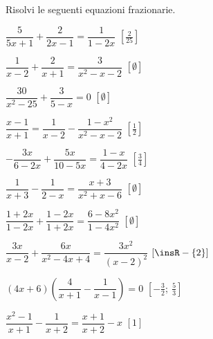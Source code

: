 \begin{esercizio}[\Ast]
\label{ese:20.21}
Risolvi le seguenti equazioni frazionarie.
\begin{multicols}{2}
\begin{enumeratea}
 \item \(\dfrac{5}{5x+1}+\dfrac{2}{2x-1}=\dfrac{1}{1-2x}\)
  \hfill \(\left[\frac{2}{25}\right]\)
 \item \(\dfrac{1}{x-2}+\dfrac{2}{x+1}=\dfrac{3}{x^{2}-x-2}\)
  \hfill \(\left[\emptyset\right]\)
 \item \(\dfrac{30}{x^{2}-25}+\dfrac{3}{5-x}=0\)
  \hfill \(\left[\emptyset\right]\)
 \item \(\dfrac{x-1}{x+1}=\dfrac{1}{x-2}-\dfrac{1-x^{2}}{x^{2}-x-2}\)
  \hfill \(\left[\frac{1}{2}\right]\)
 \item \(-{\dfrac{3x}{6-2x}}+\dfrac{5x}{10-5x}=\dfrac{1-x}{4-2x}\)
  \hfill \(\left[\frac{3}{4}\right]\)
 \item \(\dfrac{1}{x+3}-\dfrac{1}{2-x}=\dfrac{x+3}{x^{2}+x-6}\)
  \hfill \(\left[\emptyset\right]\)
 \item \(\dfrac{1+2x}{1-2x}+\dfrac{1-2x}{1+2x}=\dfrac{6-8x^{2}}{1-4x^{2}}\)
  \hfill \(\left[\emptyset\right]\)
 \item \(\dfrac{3x}{x-2}+\dfrac{6x}{x^{2}-4x+4}=\dfrac{3x^{2}}{(x-2)^{2}}\)
  \hfill \(\left[\insR-\{2\}\right]\)
 \item \((4x+6)\left(\dfrac{4}{x+1}-\dfrac{1}{x-1}\right)=0\)
  \hfill \(\left[-{\frac{3}{2}};~\frac{5}{3}\right]\)
 \item \(\dfrac{x^{2}-1}{x+1}-\dfrac{1}{x+2}=\dfrac{x+1}{x+2}-x\)
  \hfill \(\left[1\right]\)
\end{enumeratea}
\end{multicols}
\end{esercizio}

